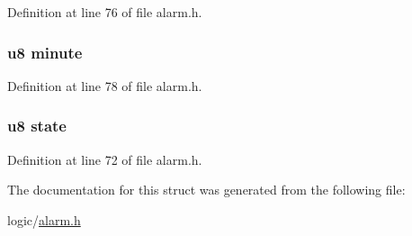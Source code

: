 \-Definition at line 76 of file alarm.\-h.

\hypertarget{structalarm_ae0a353dafc35c2935794f93a4e473a19}{
\subsubsection[{minute}]{\setlength{\rightskip}{0pt plus 5cm}u8 {\bf minute}}}\label{structalarm_ae0a353dafc35c2935794f93a4e473a19}


\-Definition at line 78 of file alarm.\-h.

\hypertarget{structalarm_ad0bc4e4e6e6ffc52d9079b73afd73887}{
\subsubsection[{state}]{\setlength{\rightskip}{0pt plus 5cm}u8 {\bf state}}}\label{structalarm_ad0bc4e4e6e6ffc52d9079b73afd73887}


\-Definition at line 72 of file alarm.\-h.



\-The documentation for this struct was generated from the following file\-:\begin{DoxyCompactItemize}
\item 
logic/\hyperlink{alarm_8h}{alarm.\-h}\end{DoxyCompactItemize}
